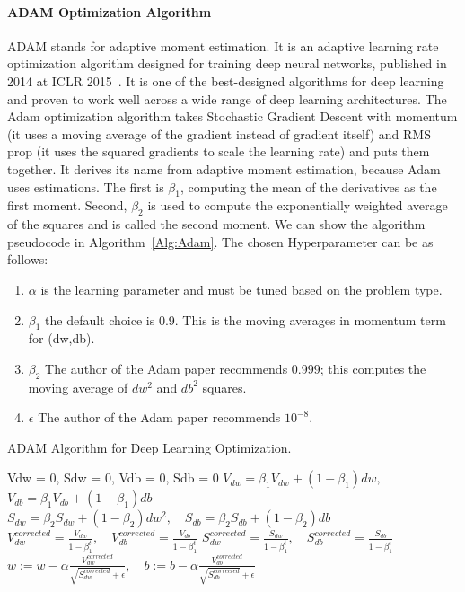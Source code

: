 \paragraph{ADAM Optimization Algorithm}
ADAM stands for adaptive moment estimation. It is an adaptive learning rate optimization algorithm designed for training deep neural networks, published in 2014 at ICLR 2015~\cite{Adam_2014}. It is one of the best-designed algorithms for deep learning and proven to work well across a wide range of deep learning architectures. The Adam optimization algorithm takes Stochastic Gradient Descent with momentum (it uses a moving average of the gradient instead of gradient itself) and RMS prop (it uses the squared gradients to scale the learning rate) and puts them together. It derives its name from adaptive moment estimation, because Adam uses estimations. The first is $\beta_1$, computing the mean of the derivatives as the first moment. Second, $\beta_2$ is used to compute the exponentially weighted average of the squares and is called the second moment. We can show the algorithm pseudocode in Algorithm~\ref{Alg:Adam}. The chosen Hyperparameter can be as follows:

\begin{enumerate}
\item $\alpha$ is the learning parameter and must be tuned based on the problem type.
\item $\beta_1$ the default choice is 0.9. This is the moving averages in momentum term for (dw,db).
\item $\beta_2$ The author of the Adam paper recommends $0.999$; this computes the moving average of $dw^2$ and $db^2$ squares.
 \item $\epsilon$ The author of the Adam paper recommends $10^{-8}$.
 \end{enumerate}

\begin{algorithm}
 \caption{ADAM Algorithm for Deep Learning Optimization.}\label{Alg:Adam}

 \begin{algorithmic}
  \State Vdw = 0, Sdw = 0, Vdb = 0, Sdb = 0
   
  \State $V_{dw} = \beta_1 V_{dw} + (1-\beta_1) dw,$\quad$ V_{db} = \beta_1 V_{db} + (1-\beta_1) db$ 
  \State $S_{dw} = \beta_2 S_{dw} + (1-\beta_2) dw^2,\quad S_{db} = \beta_2 S_{db} + (1-\beta_2) db$ 
  \State $V_{dw}^{corrected} = \frac{V_{dw}}{1-\beta_1^t} ,\quad V_{db}^{corrected} = \frac{V_{db}}{1-\beta_1^t} $
  \State $S_{dw}^{corrected} = \frac{S_{dw}}{1-\beta_1^t} ,\quad S_{db}^{corrected} = \frac{S_{db}}{1-\beta_1^t} $
  \State $w:= w-\alpha \frac{V_{dw}^{corrected}}{\sqrt{S_{dw}^{corrected}} + \epsilon},\quad b:= b-\alpha \frac{V_{db}^{corrected}}{\sqrt{S_{db}^{corrected}} + \epsilon}$
  \EndFor
 \end{algorithmic}
\end{algorithm}

